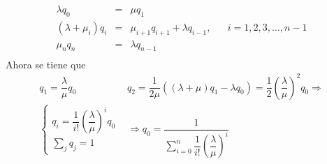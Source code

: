\[
\begin{array}{lll}
\lambda q_0&=&\mu q_1\\
(\lambda+\mu_i)q_i&=&\mu_{i+1}q_{i+1}+\lambda
q_{i-1},\hspace{20pt}
i=1,2,3,\ldots,n-1\\
\mu_nq_n&=&\lambda q_{n-1}\\

\end{array}
\]
Ahora se tiene que
\[
\begin{array}{ll}
q_1=\dfrac{\lambda}{\mu}q_0&q_2=\dfrac{1}{2\mu}\left((\lambda+\mu)q_1-
\lambda q_0\right )=\dfrac{1}{2}\left
(\dfrac{\lambda}{\mu}\right)^2q_0\Rightarrow\\[10pt] \left
\{\begin{array}{l}
q_i=\dfrac{1}{i!}\left (\dfrac{\lambda}{\mu}\right)^iq_0\\
\displaystyle\sum_j q_j=1
\end{array}\right.&
\Rightarrow q_0=\dfrac{1}{\displaystyle\sum_{i=0}^n
\dfrac{1}{i!}\left (\dfrac{\lambda}{\mu}\right)^i}
\end{array}
\]
